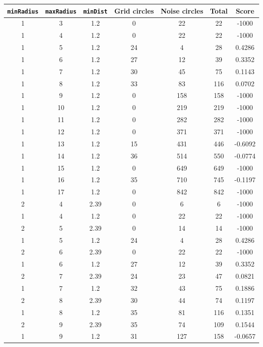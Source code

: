 \documentclass[letterpaper, 12pt]{article}
\begin{document}
\begin{longtable}{|c|c|c|c|c|c|c|}
\hline
\textbf{\texttt{minRadius}} & \textbf{\texttt{maxRadius}} & \textbf{\texttt{minDist}} & \textbf{Grid circles} & \textbf{Noise circles} & \textbf{Total} & \textbf{Score} \\
\hline
1 & 3 & 1.2 & 0 & 22 & 22 & -1000 \\
\hline
1 & 4 & 1.2 & 0 & 22 & 22 & -1000 \\
\hline
1 & 5 & 1.2 & 24 & 4 & 28 & 0.4286 \\
\hline
1 & 6 & 1.2 & 27 & 12 & 39 & 0.3352 \\
\hline
1 & 7 & 1.2 & 30 & 45 & 75 & 0.1143 \\
\hline
1 & 8 & 1.2 & 33 & 83 & 116 & 0.0702 \\
\hline
1 & 9 & 1.2 & 0 & 158 & 158 & -1000 \\
\hline
1 & 10 & 1.2 & 0 & 219 & 219 & -1000 \\
\hline
1 & 11 & 1.2 & 0 & 282 & 282 & -1000 \\
\hline
1 & 12 & 1.2 & 0 & 371 & 371 & -1000 \\
\hline
1 & 13 & 1.2 & 15 & 431 & 446 & -0.6092 \\
\hline
1 & 14 & 1.2 & 36 & 514 & 550 & -0.0774 \\
\hline
1 & 15 & 1.2 & 0 & 649 & 649 & -1000 \\
\hline
1 & 16 & 1.2 & 35 & 710 & 745 & -0.1197 \\
\hline
1 & 17 & 1.2 & 0 & 842 & 842 & -1000 \\
\hline
2 & 4 & 2.39 & 0 & 6 & 6 & -1000 \\
\hline
1 & 4 & 1.2 & 0 & 22 & 22 & -1000 \\
\hline
2 & 5 & 2.39 & 0 & 14 & 14 & -1000 \\
\hline
1 & 5 & 1.2 & 24 & 4 & 28 & 0.4286 \\
\hline
2 & 6 & 2.39 & 0 & 22 & 22 & -1000 \\
\hline
1 & 6 & 1.2 & 27 & 12 & 39 & 0.3352 \\
\hline
2 & 7 & 2.39 & 24 & 23 & 47 & 0.0821 \\
\hline
1 & 7 & 1.2 & 32 & 43 & 75 & 0.1886 \\
\hline
2 & 8 & 2.39 & 30 & 44 & 74 & 0.1197 \\
\hline
1 & 8 & 1.2 & 35 & 81 & 116 & 0.1351 \\
\hline
2 & 9 & 2.39 & 35 & 74 & 109 & 0.1544 \\
\hline
1 & 9 & 1.2 & 31 & 127 & 158 & -0.0657 \\

\end{longtable}
\end{document}
